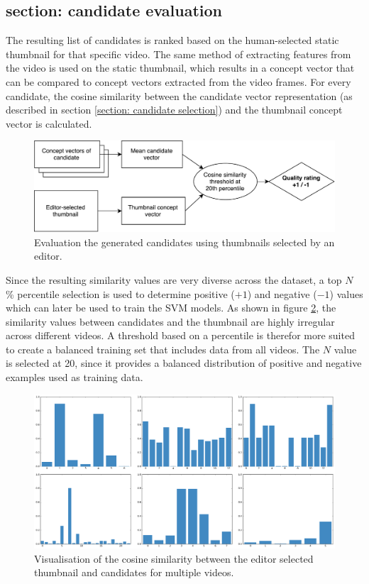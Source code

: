 \documentclass{../resources/sig-alternate-05-2015}
\begin{document}
\subsection{section: candidate evaluation}
\label{section: candidate evaluation}


The resulting list of candidates is ranked based on the human-selected static thumbnail for that specific video. The same method of extracting features from the video is used on the static thumbnail, which results in a concept vector that can be compared to concept vectors extracted from the video frames. For every candidate, the cosine similarity between the candidate vector representation (as described in section \ref{section: candidate selection}) and the thumbnail concept vector is calculated. 


\begin{figure}[h]
  \label{figure: candidate evaluation scheme}
  \includegraphics[width=\linewidth]{resources/candidate-evaluation}
  \caption{Evaluation the generated candidates using thumbnails selected by an editor.}
\end{figure}

Since the resulting similarity values are very diverse across the dataset, a top $N$ \% percentile selection is used to determine positive ($+1$) and negative ($-1$) values which can later be used to train the SVM models. As shown in figure \ref{figure: thumbnail similarity}, the similarity values between candidates and the thumbnail are highly irregular across different videos. A threshold based on a percentile is therefor more suited to create a balanced training set that includes data from all videos. The $N$ value is selected at 20, since it provides a balanced distribution of positive and negative examples used as training data.

\begin{figure}[h]
  \includegraphics[width=\linewidth]{resources/candidate-similarity.png}
  \caption{Visualisation of the cosine similarity between the editor selected thumbnail and candidates for multiple videos.}
  \label{figure: thumbnail similarity}
\end{figure}
\end{document}
